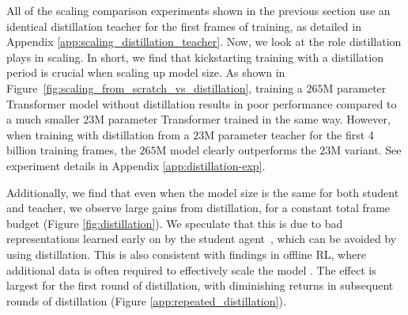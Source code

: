 All of the scaling comparison experiments shown in the previous section use an identical distillation teacher for the first frames of training, as detailed in Appendix \ref{app:scaling_distillation_teacher}. Now, we look at the role distillation plays in scaling. In short, we find that kickstarting training with a distillation period is crucial when scaling up model size. As shown in Figure~\ref{fig:scaling_from_scratch_vs_distillation}, training a $265$M parameter Transformer model without distillation results in poor performance compared to a much smaller $23$M parameter Transformer trained in the same way. However, when training with distillation from a $23$M parameter teacher for the first 4 billion training frames, the $265$M model clearly outperforms the $23$M variant. See experiment details in Appendix \ref{app:distillation-exp}.

Additionally, we find that even when the model size is the same for both student and teacher, we observe large gains from distillation, for a constant total frame budget (Figure \ref{fig:distillation}). We speculate that this is due to bad representations learned early on by the student agent~\citep{nikishin2022primacy, cetin22stabilizing}, which can be avoided by using distillation. This is also consistent with findings in offline RL, where additional data is often required to effectively scale the model \citep{reid2022wikipedia}. The effect is largest for the first round of distillation, with diminishing returns in subsequent rounds of distillation (Figure \ref{app:repeated_distillation}).